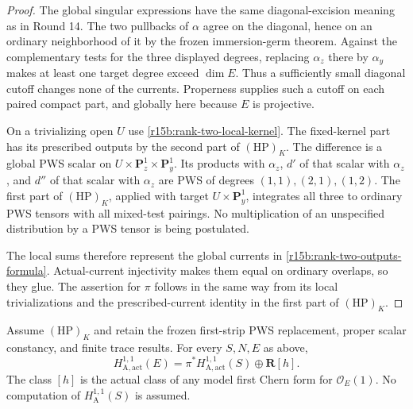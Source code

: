 \begin{proof}
The global singular expressions have the same diagonal-excision
meaning as in Round 14. The two pullbacks of $\alpha$ agree
on the diagonal, hence on an ordinary neighborhood of it by
the frozen immersion-germ theorem. Against the complementary
tests for the three displayed degrees, replacing $\alpha_z$
there by $\alpha_y$ makes at least one target degree exceed
$\dim E$. Thus a sufficiently small diagonal cutoff changes
none of the currents. Properness supplies such a cutoff on
each paired compact part, and globally here because $E$ is
projective.

On a trivializing open $U$ use
\eqref{r15b:rank-two-local-kernel}. The fixed-kernel part has
its prescribed outputs by the second part of
$(\mathrm{HP})_K$. The difference is a global PWS scalar on
$U\times\mathbf P^1_z\times\mathbf P^1_y$. Its products
with $\alpha_z$, $d'$ of that scalar with $\alpha_z$, and
$d''$ of that scalar with $\alpha_z$ are PWS of degrees
$(1,1),(2,1),(1,2)$. The first part of $(\mathrm{HP})_K$,
applied with target $U\times\mathbf P^1_y$, integrates all
three to ordinary PWS tensors with all mixed-test pairings.
No multiplication of an unspecified distribution by a PWS
tensor is being postulated.

The local sums therefore represent the global currents in
\eqref{r15b:rank-two-outputs-formula}. Actual-current
injectivity makes them equal on ordinary overlaps, so they
glue. The assertion for $\pi$ follows in the same way from
its local trivializations and the prescribed-current identity
in the first part of $(\mathrm{HP})_K$.
\end{proof}

\begin{theorem}
\label{r15b:rank-two-aeppli}
Assume $(\mathrm{HP})_K$ and retain the frozen first-strip PWS
replacement, proper scalar constancy, and finite trace results.
For every $S,N,E$ as above,
\[
 H_{\mathrm A,\mathrm{act}}^{1,1}(E)
       =\pi^*H_{\mathrm A,\mathrm{act}}^{1,1}(S)
                                      \oplus\mathbf R[h].
\tag{PB15.6}\label{r15b:rank-two-aeppli-formula}
\]
The class $[h]$ is the actual class of any model first Chern
form for $\mathcal O_E(1)$. No computation of
$H_{\mathrm A}^{1,1}(S)$ is assumed.
\end{theorem}

